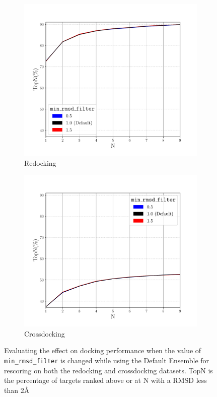 \documentclass[journal=jcisd8,manuscript=article]{achemso}
\begin{document}
\begin{figure}    
        \begin{subfigure}[b]{0.48\textwidth}    
		\centering
		\includegraphics[width=\textwidth]{figures/redocking/sweep_rmsdf_line.pdf}
		\caption{Redocking}
		\label{fig:RMSDFilterRedock}
        \end{subfigure}    
        \begin{subfigure}[b]{0.48\textwidth}    
		\centering
		\includegraphics[width=\textwidth]{figures/crossdocking/sweep_rmsdf_line.pdf}
		\caption{Crossdocking}
		\label{fig:RMSDFilterCrossdock}
        \end{subfigure}    
	\caption{Evaluating the effect on docking performance when the value of \texttt{min\_rmsd\_filter} is changed while using the Default Ensemble for rescoring on both the redocking and crossdocking datasets. TopN is the percentage of targets ranked above or at N with a RMSD less than 2{\AA}}
	\label{fig:RMSDFilter}
\end{figure}  
\end{document}
